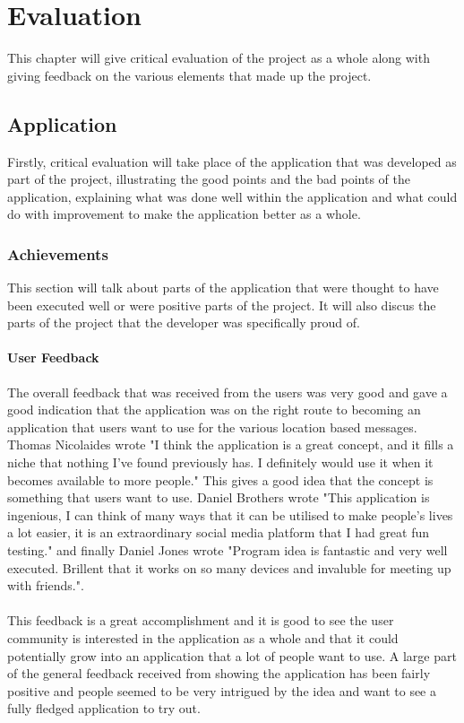 \chapter{Evaluation}

This chapter will give critical evaluation of the project as a whole along with giving feedback on the various elements that made up the project.

\section{Application}

Firstly, critical evaluation will take place of the application that was developed as part of the project, illustrating the good points and the bad points of the application, explaining what was done well within the application and what could do with improvement to make the application better as a whole.

\subsection{Achievements}

This section will talk about parts of the application that were thought to have been executed well or were positive parts of the project. It will also discus the parts of the project that the developer was specifically proud of.

\subsubsection{User Feedback}

The overall feedback that was received from the users was very good and gave a good indication that the application was on the right route to becoming an application that users want to use for the various location based messages. Thomas Nicolaides wrote "I think the application is a great concept, and it fills a niche that nothing I've found previously has. I definitely would use it when it becomes available to more people." This gives a good idea that the concept is something that users want to use. Daniel Brothers wrote "This application is ingenious, I can think of many ways that it can be utilised to make people's lives a lot easier, it is an extraordinary social media platform that I had great fun testing." and finally Daniel Jones wrote "Program idea is fantastic and very well executed. Brillent that it works on so many devices and invaluble for meeting up with friends.".\\
\\
This feedback is a great accomplishment and it is good to see the user community is interested in the application as a whole and that it could potentially grow into an application that a lot of people want to use. A large part of the general feedback received from showing the application has been fairly positive and people seemed to be very intrigued by the idea and want to see a fully fledged application to try out.

